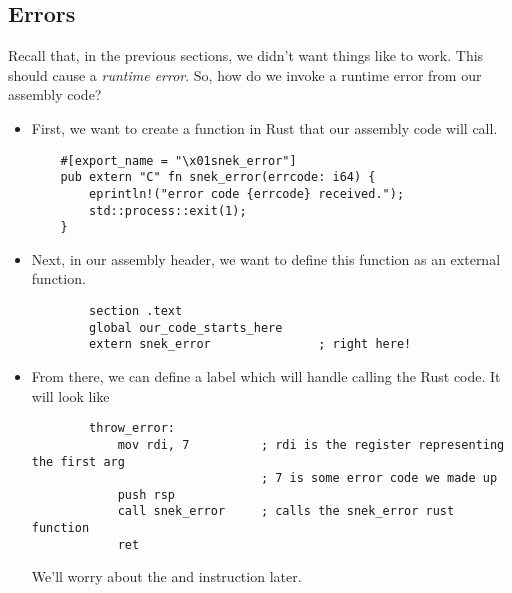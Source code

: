 \subsection{Errors}
Recall that, in the previous sections, we didn't want things like  to work. This should cause a \emph{runtime error}. So, how do we invoke a runtime error from our assembly code? 
\begin{itemize}
    \item First, we want to create a function in Rust that our assembly code will call. 
    \begin{verbatim}
    #[export_name = "\x01snek_error"]
    pub extern "C" fn snek_error(errcode: i64) {
        eprintln!("error code {errcode} received.");
        std::process::exit(1);
    }\end{verbatim}
    
    \item Next, in our assembly header, we want to define this function as an external function. 
    \begin{verbatim}
        section .text 
        global our_code_starts_here 
        extern snek_error               ; right here!\end{verbatim}

    \item From there, we can define a  label which will handle calling the Rust code. It will look like 
    \begin{verbatim}
        throw_error: 
            mov rdi, 7          ; rdi is the register representing the first arg 
                                ; 7 is some error code we made up 
            push rsp    
            call snek_error     ; calls the snek_error rust function 
            ret \end{verbatim}
    We'll worry about the  and  instruction later. 
\end{itemize}